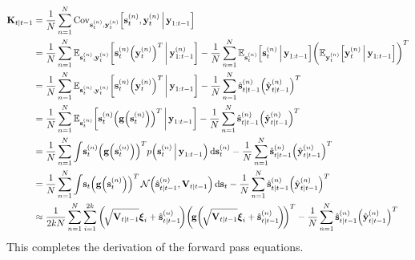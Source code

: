 		\begin{align}
			\mat{K}_{t \subgiven t - 1}
				&= \frac{1}{N} \sum_{n = 1}^{N} \Cov_{\vec{s}_t^{(n)}, \vec{y}_t^{(n)}}\!\Big[\vec{s}_t^{(n)}, \vec{y}_t^{(n)} \Biggiven \vec{y}_{1:t - 1}\Big]  \nonumber \\
				&= \frac{1}{N} \sum_{n = 1}^{N} \E_{\vec{s}_t^{(n)}, \vec{y}_t^{(n)}}\bigg[\vec{s}_t^{(n)} \Big(\vec{y}_t^{(n)}\Big)^T \bigggiven \vec{y}_{1:t - 1}^{(n)}\bigg] - \frac{1}{N} \sum_{n = 1}^{N} \E_{\vec{s}_t^{(n)}}\Big[\vec{s}_t^{(n)} \Biggiven \vec{y}_{1:t - 1}\Big] \bigg(\E_{\vec{y}_t^{(n)}}\Big[\vec{y}_t^{(n)} \Biggiven \vec{y}_{1:t - 1}\Big]\bigg)^T  \nonumber \\
				&= \frac{1}{N} \sum_{n = 1}^{N} \E_{\vec{s}_t^{(n)}, \vec{y}_t^{(n)}}\bigg[\vec{s}_t^{(n)} \Big(\vec{y}_t^{(n)}\Big)^T \bigggiven \vec{y}_{1:t - 1}\bigg] - \frac{1}{N} \sum_{n = 1}^{N} \hat{\vec{s}}_{t \subgiven t - 1}^{(n)} \Big(\hat{\vec{y}}_{t \subgiven t - 1}^{(n)}\Big)^T  \nonumber \\
				&= \frac{1}{N} \sum_{n = 1}^{N} \E_{\vec{s}_t^{(n)}}\bigg[\vec{s}_t^{(n)} \Big(\vec{g}\Big(\vec{s}_t^{(n)}\Big)\Big)^T \bigggiven \vec{y}_{1:t - 1}\bigg] - \frac{1}{N} \sum_{n = 1}^{N} \hat{\vec{s}}_{t \subgiven t - 1}^{(n)} \Big(\hat{\vec{y}}_{t \subgiven t - 1}^{(n)}\Big)^T  \nonumber \\
				&= \frac{1}{N} \sum_{n = 1}^{N} \int\! \vec{s}_t^{(n)} \Big(\vec{g}\Big(\vec{s}_t^{(n)}\Big)\Big)^T p\Big(\vec{s}_t^{(n)} \Biggiven \vec{y}_{1:t - 1}\Big) \dd{\vec{s}_t^{(n)}} - \frac{1}{N} \sum_{n = 1}^{N} \hat{\vec{s}}_{t \subgiven t - 1}^{(n)} \Big(\hat{\vec{y}}_{t \subgiven t - 1}^{(n)}\Big)^T  \nonumber \\
				&= \frac{1}{N} \sum_{n = 1}^{N} \int\! \vec{s}_t \Big(\vec{g}\Big(\vec{s}_t^{(n)}\Big)\Big)^T \,\normal\Big(\hat{\vec{s}}_{t \subgiven t - 1}^{(n)}, \mat{V}_{t \subgiven t - 1}\Big) \dd{\vec{s}_t} - \frac{1}{N} \sum_{n = 1}^{N} \hat{\vec{s}}_{t \subgiven t - 1}^{(n)} \Big(\hat{\vec{y}}_{t \subgiven t - 1}^{(n)}\Big)^T  \nonumber \\
				&\approx \frac{1}{2kN} \sum_{n = 1}^{N}  \sum_{i = 1}^{2k} \bigg(\!\sqrt{\mat{V}_{t \subgiven t - 1}} \vec{\xi}_i + \hat{\vec{s}}_{t \subgiven t - 1}^{(n)}\!\bigg) \bigg(\!\vec{g}\bigg(\!\sqrt{\mat{V}_{t \subgiven t - 1}} \vec{\xi}_i + \hat{\vec{s}}_{t \subgiven t - 1}^{(n)}\!\bigg)\!\bigg)^T - \frac{1}{N} \sum_{n = 1}^{N} \hat{\vec{s}}_{t \subgiven t - 1}^{(n)} \Big(\hat{\vec{y}}_{t \subgiven t - 1}^{(n)}\Big)^T  \label{eq:cubatureK}
		\end{align}
		This completes the derivation of the forward pass equations.
		
